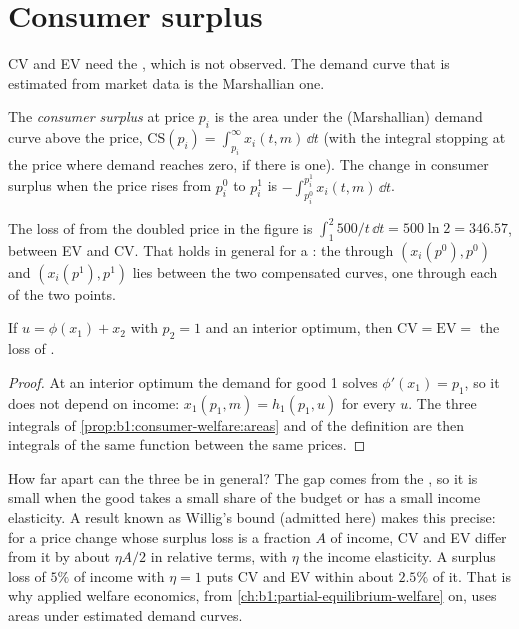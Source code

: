 \section{Consumer surplus}\label{sec:b1:consumer-welfare:surplus}

CV and EV need the , which is not observed. The demand
curve that is estimated from market data is the Marshallian one.

\begin{definition}\label{def:b1:consumer-welfare:consumer-surplus}
The \emph{consumer surplus} at price $p_i$ is the area under the
(Marshallian) demand curve above the price,
$\mathrm{CS}(p_i) = \int_{p_i}^{\infty} x_i(t, m)\,\dd t$ (with the integral
stopping at the price where demand reaches zero, if there is one). The
change in consumer surplus when the price rises from $p_i^0$ to $p_i^1$ is
$-\int_{p_i^0}^{p_i^1} x_i(t, m)\,\dd t$.
\end{definition}

The loss of  from the doubled price in the figure is
$\int_1^2 500/t\,\dd t = 500\ln 2 = 346.57$, between EV and CV. That holds in
general for a : the  through $(x_i(p^0), p^0)$
and $(x_i(p^1), p^1)$ lies between the two compensated curves, one through each
of the two points.

\begin{proposition}\label{prop:b1:consumer-welfare:quasi}
If $u = \phi(x_1) + x_2$ with $p_2 = 1$ and an interior optimum, then
$\mathrm{CV} = \mathrm{EV} = $ the loss of .
\end{proposition}

\begin{proof}
At an interior optimum the demand for good 1 solves $\phi'(x_1) = p_1$, so it
does not depend on income: $x_1(p_1, m) = h_1(p_1, u)$ for every $u$. The three
integrals of \cref{prop:b1:consumer-welfare:areas} and of the definition are
then integrals of the same function between the same prices.
\end{proof}

How far apart can the three be in general? The gap comes from the , so it is small when the good takes a small share of the budget or
has a small income elasticity. A result known as Willig's bound (admitted
here) makes this precise: for a price change whose surplus loss is a
fraction $A$ of income, CV and EV differ from it by about
$\eta A/2$ in relative terms, with $\eta$ the income elasticity. A surplus
loss of $5\%$ of income with $\eta = 1$ puts CV and EV within about $2.5\%$
of it. That is why applied welfare economics, from \cref{ch:b1:partial-equilibrium-welfare}
on, uses areas under estimated demand curves.


